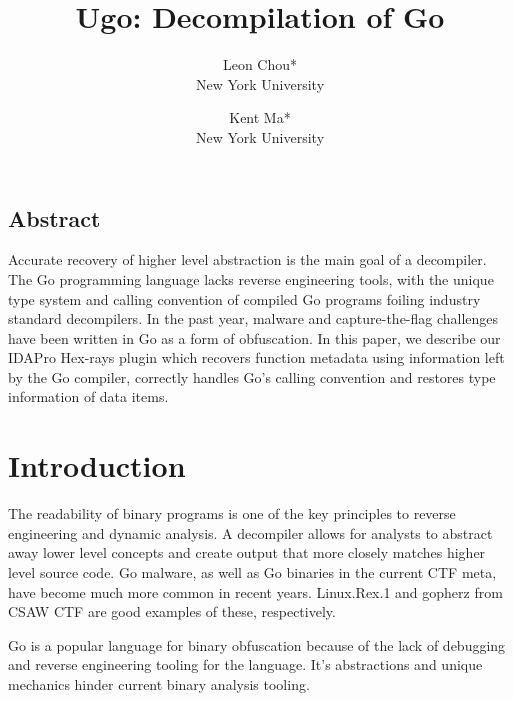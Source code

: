 \documentclass[letterpaper,twocolumn,10pt]{article}
\begin{document}
\date{}

\title{\Large \bf Ugo: Decompilation of Go}

\author{
{\rm Leon Chou*}\\
New York University
\and
{\rm Kent Ma*}\\
New York University
} %

\maketitle




\subsection*{Abstract}
Accurate recovery of higher level abstraction is the main goal of a decompiler. The Go programming language lacks reverse engineering tools, with the unique type system and calling convention of compiled Go programs foiling industry standard decompilers. In the past year, malware and capture-the-flag challenges have been written in Go as a form of obfuscation. In this paper, we describe our IDAPro Hex-rays plugin which recovers function metadata using information left by the Go compiler, correctly handles Go’s calling convention and restores type information of data items.

\section{Introduction}

The readability of binary programs is one of the key principles to reverse engineering and dynamic analysis. A decompiler allows for analysts to abstract away lower level concepts and create output that more closely matches higher level source code. Go malware, as well as Go binaries in the current CTF meta, have become much more common in recent years. Linux.Rex.1 and gopherz from CSAW CTF are good examples of these, respectively.

Go is a popular language for binary obfuscation because of the lack of debugging and reverse engineering tooling for the language. It’s abstractions and unique mechanics hinder current binary analysis tooling.
\end{document}
